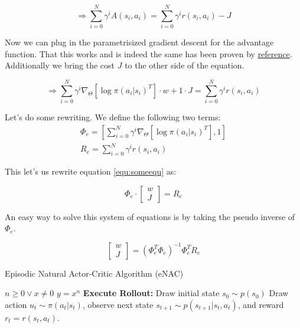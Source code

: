 \begin{equation}
	\Rightarrow \sum_{i = 0}^{N}\gamma^i A(s_i, a_i) = \sum_{i = 0}^{N}\gamma^i r(s_i, a_i) - J
\end{equation}

\noindent Now we can plug in the parametrisized gradient descent for the advantage function. That this works and is indeed the same has been proven by \underline{reference}. Additionally we bring the cost $J$ to the other side of the equation.

\begin{equation}
	\label{equ:someequ}
	\Rightarrow \sum_{i = 0}^{N} \gamma^i \nabla_{\Theta} \left[\log \pi(a_i | s_i)^T\right] \cdot w + 1 \cdot J = \sum_{i = 0}^{N}\gamma^i r(s_i, a_i)
\end{equation}

\noindent Let's do some rewriting. We define the following two terms:
\begin{align}
	\Phi_e = \left[  \sum_{i = 0}^{N} \gamma^i \nabla_{\Theta} \left[\log \pi(a_i | s_i)^T\right] , 1 \right]\\
	R_e = \sum_{i = 0}^{N}\gamma^i r(s_i, a_i)
\end{align}

\noindent This let's us rewrite equation \ref{equ:someequ} as:

\begin{equation}
	\Phi_e \cdot \begin{bmatrix} w\\J \end{bmatrix}  = R_e
\end{equation}

\noindent An easy way to solve this system of equations is by taking the pseudo inverse of $\Phi_e$.

\begin{equation}
	\begin{bmatrix} w\\J \end{bmatrix} = (\Phi_e^T \Phi_e)^{-1} \Phi_e^T R_e
\end{equation}

\begin{algorithm}
	\caption{Episodic Natural Actor-Critic Algorithm (eNAC)}\label{euclid}
	\begin{algorithmic}
		\REQUIRE $n \geq 0 \vee x \neq 0$
		\ENSURE $y = x^n$
				\STATE \textbf{Execute Rollout:} Draw initial state $s_0 \sim p(s_0)$
					\STATE Draw action $u_t\sim\pi(a_t|s_t)$, observe next state $s_{t+1} \sim p(s_{t+1}|s_t, a_t)$, and reward $r_t = r(s_t, a_t)$.
				\ENDFOR
			\ENDFOR
		\ENDFOR
	\end{algorithmic}
\end{algorithm}




